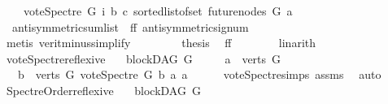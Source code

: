 \begin{isabellebody}
\ \ \ \ {\isacharparenleft}{\kern0pt}vote{\isacharunderscore}{\kern0pt}Spectre\ G\ i\ b\ c{\isacharparenright}{\kern0pt}{\isacharparenright}{\kern0pt}\ {\isacharparenleft}{\kern0pt}sorted{\isacharunderscore}{\kern0pt}list{\isacharunderscore}{\kern0pt}of{\isacharunderscore}{\kern0pt}set\ {\isacharparenleft}{\kern0pt}future{\isacharunderscore}{\kern0pt}nodes\ G\ a{\isacharparenright}{\kern0pt}{\isacharparenright}{\kern0pt}{\isacharparenright}{\kern0pt}{\isacharparenright}{\kern0pt}{\isacharparenright}{\kern0pt}{\isachardoublequoteclose}\ \isanewline
\ \ \ \ \ \ \isamarkupfalse%
\ \ antisymmetric{\isacharunderscore}{\kern0pt}sumlist\ {}\ ff{}\ antisymmetric{\isacharunderscore}{\kern0pt}signum\ \isanewline
\ \ \ \ \ \ \isamarkupfalse%
\ {\isacharparenleft}{\kern0pt}metis\ verit{\isacharunderscore}{\kern0pt}minus{\isacharunderscore}{\kern0pt}simplify{\isacharparenleft}{\kern0pt}{}{\isacharparenright}{\kern0pt}{\isacharparenright}{\kern0pt}\ \isanewline
\ \ \ \ \isamarkupfalse%
\ \isamarkupfalse%
\ {\isacharquery}{\kern0pt}thesis\ \isamarkupfalse%
\ ff\isanewline
\ \ \ \ \ \ \isamarkupfalse%
\ linarith\ \isanewline
\ \ \isamarkupfalse%
\ \ \isanewline
{}\isamarkupfalse%
%
\endisatagproof
{\isafoldproof}%
%
\isadelimproof
\isanewline
%
\endisadelimproof
\isanewline
\isanewline
{}\isamarkupfalse%
\ vote{\isacharunderscore}{\kern0pt}Spectre{\isacharunderscore}{\kern0pt}reflexive{\isacharcolon}{\kern0pt}\isanewline
\ \ \ {\isachardoublequoteopen}blockDAG\ G{\isachardoublequoteclose}\isanewline
\ \ \ \ \ {\isachardoublequoteopen}a\ {\isasymin}\ verts\ G{\isachardoublequoteclose}\isanewline
\ \ \ {\isachardoublequoteopen}{\isasymforall}b\ {\isasymin}\ verts\ G{\isachardot}{\kern0pt}\ vote{\isacharunderscore}{\kern0pt}Spectre\ G\ b\ a\ a\ {\isacharequal}{\kern0pt}\ {}\ {\isachardoublequoteclose}%
\isadelimproof
\ %
\endisadelimproof
%
\isatagproof
{}\isamarkupfalse%
\ vote{\isacharunderscore}{\kern0pt}Spectre{\isachardot}{\kern0pt}simps\ assms\ \isamarkupfalse%
\ auto%
\endisatagproof
{\isafoldproof}%
%
\isadelimproof
%
\endisadelimproof
\ \isanewline
\isanewline
{}\isamarkupfalse%
\ Spectre{\isacharunderscore}{\kern0pt}Order{\isacharunderscore}{\kern0pt}reflexive{\isacharcolon}{\kern0pt}\isanewline
\ \ \ {\isachardoublequoteopen}blockDAG\ G{\isachardoublequoteclose}\isanewline

\end{isabellebody}
